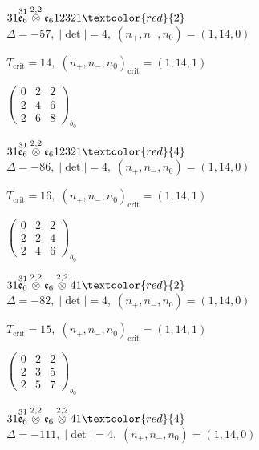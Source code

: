 \documentclass[10pt]{article}
\begin{document}
\smallskip

$31\overset{31}{\mathfrak{e}_6}\overset{2,2}{\otimes}\mathfrak{e}_612321\textcolor{red}{2}$ \quad $\Delta=-57,\; |\det|=4,\; (n_+,n_-,n_0)=(1,14,0)$

\hspace{1em}$T_{\text{crit}}=14,\; (n_+,n_-,n_0)_{\text{crit}}=(1,14,1)$

\hspace{2em}$\left(\begin{smallmatrix}0 & 2 & 2 \\ 2 & 4 & 6 \\ 2 & 6 & 8\end{smallmatrix}\right)_{\!b_0}$

$31\overset{31}{\mathfrak{e}_6}\overset{2,2}{\otimes}\mathfrak{e}_612321\textcolor{red}{4}$ \quad $\Delta=-86,\; |\det|=4,\; (n_+,n_-,n_0)=(1,14,0)$

\hspace{1em}$T_{\text{crit}}=16,\; (n_+,n_-,n_0)_{\text{crit}}=(1,14,1)$

\hspace{2em}$\left(\begin{smallmatrix}0 & 2 & 2 \\ 2 & 2 & 4 \\ 2 & 4 & 6\end{smallmatrix}\right)_{\!b_0}$

\smallskip

$31\overset{31}{\mathfrak{e}_6}\overset{2,2}{\otimes}\mathfrak{e}_6\overset{2,2}{\otimes}41\textcolor{red}{2}$ \quad $\Delta=-82,\; |\det|=4,\; (n_+,n_-,n_0)=(1,14,0)$

\hspace{1em}$T_{\text{crit}}=15,\; (n_+,n_-,n_0)_{\text{crit}}=(1,14,1)$

\hspace{2em}$\left(\begin{smallmatrix}0 & 2 & 2 \\ 2 & 3 & 5 \\ 2 & 5 & 7\end{smallmatrix}\right)_{\!b_0}$

$31\overset{31}{\mathfrak{e}_6}\overset{2,2}{\otimes}\mathfrak{e}_6\overset{2,2}{\otimes}41\textcolor{red}{4}$ \quad $\Delta=-111,\; |\det|=4,\; (n_+,n_-,n_0)=(1,14,0)$
\end{document}
